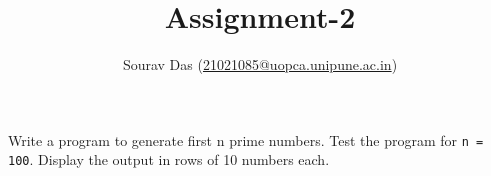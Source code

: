 \documentclass[11pt]{article} %
\title{Assignment-2}
\author{Sourav Das (\url{21021085@uopca.unipune.ac.in})}
\date{} %
\begin{document}
\maketitle

Write a program to generate first n prime numbers. Test the program for \lstinline{n = 100}.  Display the output in rows of 10 numbers each.
\end{document}
